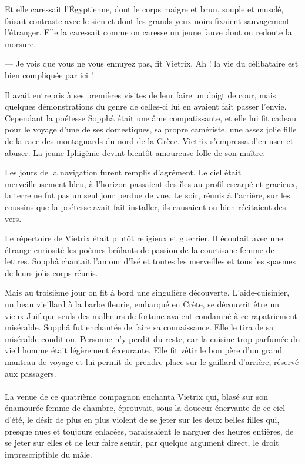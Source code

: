 \documentclass[a4paper, 11pt, oneside, polutonikogreek, french]{article}
\begin{document}
Et elle caressait l'Égyptienne, dont le corps maigre et brun, souple et musclé, faisait contraste avec le sien et dont les grands yeux noirs fixaient sauvagement l'étranger. Elle la caressait comme on caresse un jeune fauve dont on redoute la morsure.

--- Je vois que vous ne vous ennuyez pas, fit Vietrix. Ah ! la vie du célibataire est bien compliquée par ici !

Il avait entrepris à ses premières visites de leur faire un doigt de cour, mais quelques démonstrations du genre de celles-ci lui en avaient fait passer l'envie. Cependant la poétesse Sopphâ était une âme compatissante, et elle lui fit cadeau pour le voyage d'une de ses domestiques, sa propre camériste, une assez jolie fille de la race des montagnards du nord de la Grèce. Vietrix s'empressa d'en user et abuser. La jeune Iphigénie devint bientôt amoureuse folle de son maître.

\bigskip
\centerline{\EightStarTaper}
\centerline{\EightStarTaper\EightStarTaper}
\bigskip

Les jours de la navigation furent remplis d'agrément. Le ciel était merveilleusement bleu, à l'horizon passaient des îles au profil escarpé et gracieux, la terre ne fut pas un seul jour perdue de vue. Le soir, réunis à l'arrière, sur les coussins que la poétesse avait fait installer, ils causaient ou bien récitaient des vers.

Le répertoire de Vietrix était plutôt religieux et guerrier. Il écoutait avec une étrange curiosité les poèmes brûlants de passion de la courtisane femme de lettres. Sopphâ chantait l'amour d'Isé et toutes les merveilles et tous les spasmes de leurs jolis corps réunis.

\bigskip
\centerline{\EightStarTaper}
\centerline{\EightStarTaper\EightStarTaper}
\bigskip

Mais au troisième jour on fit à bord une singulière découverte. L'aide-cuisinier, un beau vieillard à la barbe fleurie, embarqué en Crète, se découvrit être un vieux Juif que seuls des malheurs de fortune avaient condamné à ce rapatriement misérable. Sopphâ fut enchantée de faire sa connaissance. Elle le tira de sa misérable condition. Personne n'y perdit du reste, car la cuisine trop parfumée du vieil homme était légèrement écœurante. Elle fit vêtir le bon père d'un grand manteau de voyage et lui permit de prendre place sur le gaillard d'arrière, réservé aux passagers.
\clearpage
\paragraph{}
La venue de ce quatrième compagnon enchanta Vietrix qui, blasé sur son énamourée femme de chambre, éprouvait, sous la douceur énervante de ce ciel d'été, le désir de plus en plus violent de se jeter sur les deux belles filles qui, presque nues et toujours enlacées, paraissaient le narguer des heures entières, de se jeter sur elles et de leur faire sentir, par quelque argument direct, le droit imprescriptible du mâle.
\end{document}
